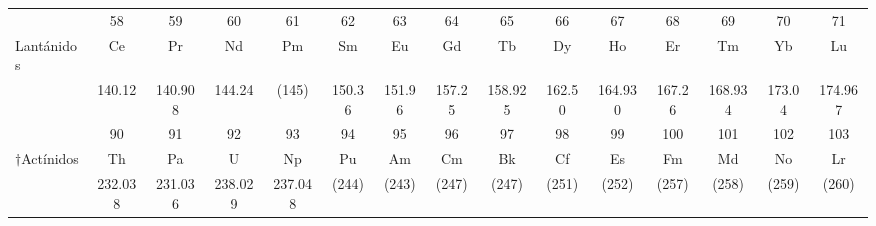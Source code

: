 \documentclass[10pt,landscape]{book}
\begin{document}
\begin{tabular}{|p{3.5cm}|*{14}{c|}}
    \hline
                           & \small 58      & \small 59      & \small 60      & \small 61      & \small 62     & \small 63     & \small 64     & \small 65      & \small 66     & \small 67      & \small 68     & \small 69      & \small 70     & \small 71      \\[-1mm]
    \sc *Lantánidos        & Ce             & Pr             & Nd             & Pm             & Sm            & Eu            & Gd            & Tb             & Dy            & Ho             & Er            & Tm             & Yb            & Lu             \\[-2mm]
                           & \small 140.12  & \small 140.908 & \small 144.24  & \small (145)   & \small 150.36 & \small 151.96 & \small 157.25 & \small 158.925 & \small 162.50 & \small 164.930 & \small 167.26 & \small 168.934 & \small 173.04 & \small 174.967 \\[-1mm]
    \hline
                           & \small 90      & \small 91      & \small 92      & \small 93      & \small 94     & \small 95     & \small 96     & \small 97      & \small 98     & \small 99      & \small 100    & \small 101     & \small 102    & \small 103     \\[-1mm]
    \sc $\dagger$Actínidos & Th             & Pa             & U              & Np             & Pu            & Am            & Cm            & Bk             & Cf            & Es             & Fm            & Md             & No            & Lr             \\[-2mm]
                           & \small 232.038 & \small 231.036 & \small 238.029 & \small 237.048 & \small (244)  & \small (243)  & \small (247)  & \small (247)   & \small (251)  & \small (252)   & \small (257)  & \small (258)   & \small (259)  & \small (260)   \\
    \hline
\end{tabular}
\end{document}
